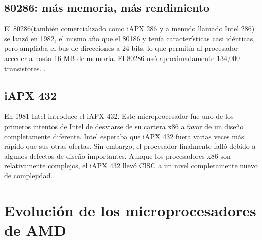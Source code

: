 \subsection{80286: más memoria, más rendimiento}

El 80286(también comercializado como iAPX 286 y a menudo llamado Intel 286) se lanzó en 1982, el mismo año que el 80186 y tenía características 
casi idénticas, pero ampliaba el bus de direcciones a 24 bits, lo que permitía al procesador acceder a hasta 16 MB de memoria.
El 80286 usó aproximadamente 134,000 transistores. 
.

\subsection{iAPX 432}
En 1981 Intel introduce el iAPX 432. Este microprocesador fue uno de los primeros intentos de Intel de desviarse de su cartera x86 a favor de un 
diseño completamente diferente. Intel esperaba que iAPX 432 fuera varias veces más rápido que sus otras ofertas. Sin embargo, el procesador 
finalmente falló debido a algunos defectos de diseño importantes. Aunque los procesadores x86 son relativamente complejos, el iAPX 432 
llevó CISC a un nivel completamente nuevo de complejidad.


\section{Evolución de los microprocesadores de AMD}





